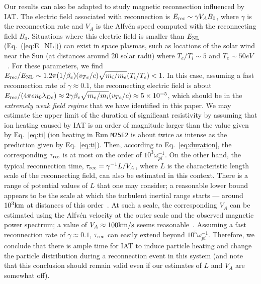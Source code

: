 \documentclass[%
 reprint,
 amsmath,
 amssymb,
 aps,
 prx,
floatfix,
superscriptaddress
]{revtex4-2}
\begin{document}
Our results can also be adapted to study magnetic reconnection influenced by IAT.
The electric field associated with reconnection is $E_{\rm{rec}}\sim \gamma V_A B_0$, where $\gamma$ is the reconnection rate and $V_A$ is the Alfv\'en speed computed with the reconnecting field $B_0$. 
Situations where this electric field is smaller than $E_{\rm NL}$ (Eq.~(\ref{eq:E_NL})) can exist in space plasmas, such as locations of the solar wind near the Sun (at distances around 20 solar radii) where $T_e/T_i \sim 5$ and $T_e \sim 50 eV$~\cite{mozer2021triggered}. 
For these parameters, we find $E_{\rm{rec}}/E_{\rm{NL}} \sim 1.2\pi (1/\beta_e) (v_{Te}/c) \sqrt{m_i/m_e} (T_i/T_e) < 1$.
In this case, assuming a fast reconnection rate of $\gamma\approx 0.1$, the reconnecting electric field is about $E_{\rm rec}/(4\pi e n_0\lambda_{De}) \approx 2\gamma\beta_e  \sqrt{m_e/m_i} (v_{Te}/c) \approx 5\times10^{-5}$, which should be in the {\it extremely weak field regime} that we have identified in this paper.
We may estimate the upper limit of the duration of significant resistivity by assuming that ion heating caused by IAT is an order of magnitude larger than the value given by Eq.~\eqref{eq:ti} (ion heating in Run {\tt M25E2} is about twice as intense as the prediction given by Eq.~\eqref{eq:ti}).
Then, according to Eq.~\eqref{eq:duration}, the corresponding $\tau_{\rm res}$ is at most on the order of $10^3\omega_{pi}^{-1}$.
On the other hand, the typical reconnection time, $\tau_{\rm{rec}}=\gamma^{-1} L/V_A$, where $L$ is the characteristic length scale of the reconnecting field, can also be estimated in this context.
There is a range of potential values of $L$ that one may consider; a reasonable lower bound appears to be the scale at which the turbulent inertial range starts ---  around $10^3\rm{km}$ at distances of this order~\cite{coles1988solar, lotz2023radial,huang2023new}.
At such a scale, the corresponding $V_A$ can be estimated using the Alfv\'en velocity at the outer scale and the observed magnetic power spectrum; a value of $V_A\approx 100 \rm{km/s}$ seems reasonable~\cite{huang2023new}. 
Assuming a fast reconnection rate of $\gamma \approx 0.1$, $\tau_{\rm{rec}}$ can easily extend beyond $10^{5} \omega_{pi}^{-1}$.
Therefore, we conclude that there is ample time for IAT to induce particle heating and change the particle distribution during a reconnection event in this system (and note that this conclusion should remain valid even if our estimates of $L$ and $V_A$ are somewhat off).
\end{document}
